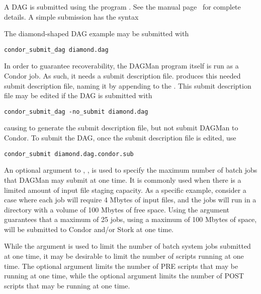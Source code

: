 A DAG is submitted using the program .
See the manual
page~\pageref{man-condor-submit-dag}
for complete details.
A simple submission has the syntax

 

The diamond-shaped DAG example may be submitted with

\begin{verbatim}
condor_submit_dag diamond.dag
\end{verbatim}
In order to guarantee recoverability, the DAGMan program itself
is run as a Condor job.
As such, it needs a submit description file.
 produces this needed submit description file,
naming it by appending  to the .
This submit description file may be edited if the DAG is
submitted with

\begin{verbatim}
condor_submit_dag -no_submit diamond.dag
\end{verbatim}
causing  to generate the submit description file,
but not submit DAGMan to Condor.
To submit the DAG, once the submit description file is edited,
use

\begin{verbatim}
condor_submit diamond.dag.condor.sub
\end{verbatim}

An optional argument to , , 
is used to specify the maximum number of batch jobs that DAGMan may
submit at one time.
It is commonly used when 
there is a limited amount of input file staging capacity.
As a specific example, consider a case where each job will
require 4 Mbytes of input files,
and the jobs will run in a directory with a volume of 100 Mbytes
of free space.
Using the argument  guarantees that a maximum
of 25 jobs, using a maximum of 100 Mbytes of space,
will be submitted to Condor and/or Stork at one time.

While the  argument is used to limit the number
of batch system jobs submitted at one time,
it may be desirable to limit the number of scripts running
at one time.
The optional  argument limits the number of PRE
scripts that may be running at one time,
while the optional  argument limits the number of POST
scripts that may be running at one time.

